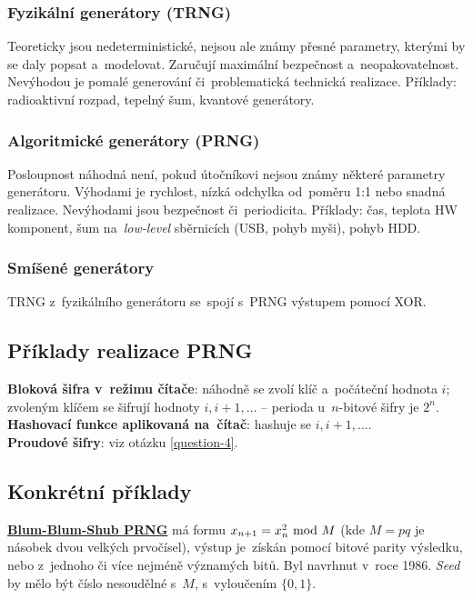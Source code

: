\subsubsection*{Fyzikální generátory (TRNG)}

Teoreticky jsou nedeterministické, nejsou ale známy přesné parametry, kterými by se daly popsat a~modelovat. Zaručují maximální bezpečnost a~neopakovatelnost. Nevýhodou je pomalé generování či~problematická technická realizace. Příklady: radioaktivní rozpad, tepelný šum, kvantové generátory.

\subsubsection*{Algoritmické generátory (PRNG)}

Posloupnost náhodná není, pokud útočníkovi nejsou známy některé parametry generátoru. Výhodami je rychlost, nízká odchylka od~poměru 1:1 nebo snadná realizace. Nevýhodami jsou bezpečnost či~periodicita. Příklady: čas, teplota HW komponent, šum na~\emph{low-level} sběrnicích (USB, pohyb myši), pohyb HDD.

\subsubsection*{Smíšené generátory}

TRNG z~fyzikálního generátoru se~spojí s~PRNG výstupem pomocí XOR.

\subsection{Příklady realizace PRNG}

\textbf{Bloková šifra v~režimu čítače}: náhodně se zvolí klíč a~počáteční hodnota $i$; zvoleným klíčem se šifrují hodnoty $i, i+1, \dots$ -- perioda u~$n$-bitové šifry je $2^n$. \\
\textbf{Hashovací funkce aplikovaná na~čítač}: hashuje se $i, i+1, \dots$. \\
\textbf{Proudové šifry}: viz otázku \ref{question-4}.

\subsection{Konkrétní příklady}

\textbf{\href{https://en.wikipedia.org/wiki/Blum_Blum_Shub}{Blum-Blum-Shub PRNG}} má formu $x_{n+1} = x_n^2 \ \mathrm{mod}\ M$ (kde $M = pq$ je násobek dvou velkých prvočísel), výstup je~získán pomocí bitové parity výsledku, nebo z~jednoho či více nejméně významých bitů. Byl navrhnut v~roce 1986. \emph{Seed} by mělo být číslo nesoudělné s~$M$, s~vyloučením $\{0, 1\}$.

